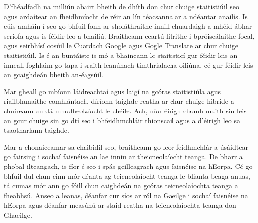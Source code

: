 \begin{multicols}{2}
D’fhéadfadh na milliún abairt bheith de dhíth don chur chuige staitistiúil seo agus ardaítear an fheidhmíocht de réir an lín téacsanna ar a ndéantar anailís. Is cúis amháin í seo go bhfuil fonn ar sholáthraithe innill chuardaigh a mhéid ábhar scríofa agus is féidir leo a bhailiú. Braitheann ceartú litrithe i bpróiseálaithe focal, agus seirbhísí cosúil le Cuardach Google agus Gogle Translate ar chur chuige staitistiúil. Is é an buntáiste is mó a bhaineann le staitisticí gur féidir leis an inneall foghlaim go tapa i sraith leanúnach timthrialacha oiliúna, cé gur féidir leis an gcaighdeán bheith an-éagsúil. 

Mar gheall go mbíonn láidreachtaí agus laigí na gcóras staitistiúla agus riailbhunaithe comhlántach, díríonn taighde reatha ar chur chuige hibride a chuireann an dá mhodheolaíocht le chéile. Ach, níor éirigh chomh maith sin leis an gcur chuige sin go dtí seo i bhfeidhmchláir thionscail agus a d’éirigh leo sa tsaotharlann taighde. 

Mar a chonaiceamar sa chaibidil seo, braitheann go leor feidhmchlár a úsáidtear go fairsing i sochaí faisnéise an lae inniu ar theicneolaíocht teanga. De bharr a phobal ilteangach, is fíor é seo i spás geilleagrach agus faisnéise na hEorpa. Cé go bhfuil dul chun cinn mór déanta ag teicneolaíocht teanga le blianta beaga anuas, tá cumas mór ann go fóill chun caighdeán na gcóras teicneolaíochta teanga a fheabhsú. Anseo a leanas, déanfar cur síos ar ról na Gaeilge i sochaí faisnéise na hEorpa agus déanfar measúnú ar staid reatha na teicneolaíochta teanga don Ghaeilge.
\end{multicols}

\clearpage


\label{IrishInfso_ga}

